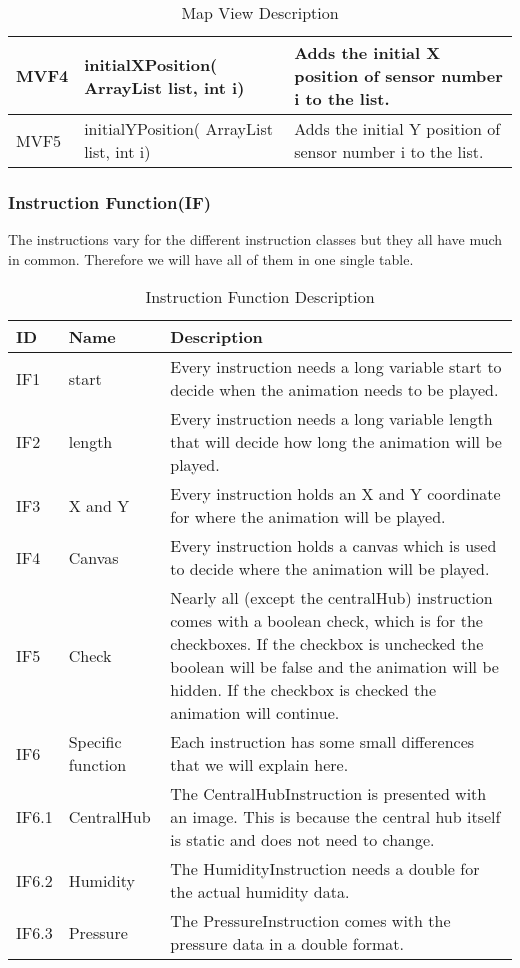 \documentclass[../document]{subfiles}
\begin{document}
\begin{table}[H]
\caption{Map View Description}
\centering
\begin{tabularx}{\textwidth}{|L{1.2cm}|L{3.5cm}|X|}
	\hline
	MVF4
	&initialXPosition( ArrayList list, int i)
	&Adds the initial X position of sensor number i to the list.
	\\ \hline MVF5
	&initialYPosition( ArrayList list, int i)
	&Adds the initial Y position of sensor number i to the list.
	\\ \hline 
\end{tabularx}
\end{table}

\subsubsection{Instruction Function(IF)}
The instructions vary for the different instruction classes but they all have much in common. Therefore we will have all of them in one single table.
\begin{table}[H]
\caption{Instruction Function Description}
\centering
\begin{tabularx}{\textwidth}{|L{1.2cm}|L{3.5cm}|X|}
	\hline
	ID
	&Name
	&Description
	\\ \hline IF1
	&start
	&Every instruction needs a long variable start to decide when the animation needs to be played.
	\\ \hline IF2
	&length
	&Every instruction needs a long variable length that will decide how long the animation will be played.
	\\ \hline IF3
	&X and Y
	&Every instruction holds an X and Y coordinate for where the animation will be played.
	\\ \hline IF4
	&Canvas
	&Every instruction holds a canvas which is used to decide where the animation will be played.
	\\ \hline IF5
	&Check
	&Nearly all (except the centralHub) instruction comes with a boolean check, which is for the checkboxes. If the checkbox is unchecked the boolean will be false and the animation will be hidden. If the checkbox is checked the animation will continue.
	\\ \hline IF6
	&Specific function
	&Each instruction has some small differences that we will explain here.
	\\ \hline IF6.1
	&CentralHub
	&The CentralHubInstruction is presented with an image. This is because the central hub itself is static and does not need to change.
	\\ \hline IF6.2
	&Humidity
	&The HumidityInstruction needs a double for the actual humidity data. 
	\\ \hline IF6.3
	&Pressure
	&The PressureInstruction comes with the pressure data in a double format.
	\\ \hline 
\end{tabularx}
\end{table}
\end{document}
